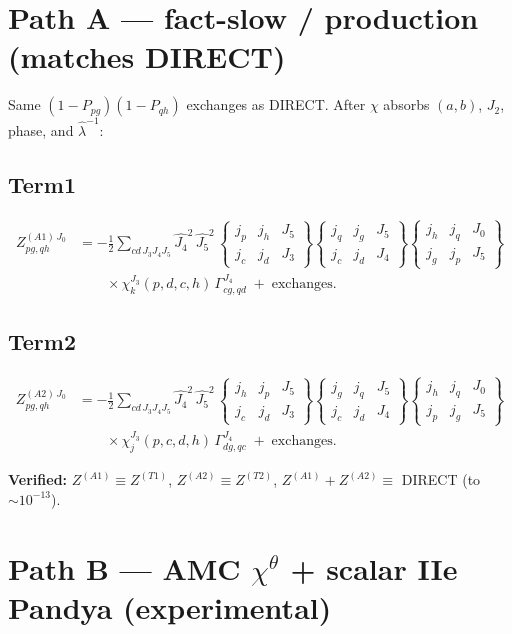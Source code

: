 \documentclass[11pt]{article}
\newcommand{\sixj}[6]{\begin{Bmatrix} #1 & #2 & #3 \\ #4 & #5 & #6 \end{Bmatrix}}
\newcommand{\Jhat}[1]{\widehat{#1}}
\begin{document}
\section{Path A --- fact-slow / production (matches DIRECT)}
\label{sec:patha}

Same $(1-P_{pg})(1-P_{qh})$ exchanges as DIRECT. After $\chi$ absorbs
$(a,b)$, $J_2$, phase, and $\hat\lambda^{-1}$:

\subsection{Term1}
\begin{equation}
\begin{aligned}
Z^{(A1)\,J_0}_{pg,qh}
&=-\frac12\sum_{cd\,J_3J_4J_5}
\Jhat{J_4}^{2}\,\Jhat{J_5}^{2}\,
\sixj{j_p}{j_h}{J_5}{j_c}{j_d}{J_3}
\sixj{j_q}{j_g}{J_5}{j_c}{j_d}{J_4}
\sixj{j_h}{j_q}{J_0}{j_g}{j_p}{J_5}\\
&\qquad\times
\chi_k^{J_3}(p,d,c,h)\,
\Gamma^{J_4}_{cg,qd}
\;+\;\text{exchanges}.
\end{aligned}
\label{eq:patha-t1}
\end{equation}

\subsection{Term2}
\begin{equation}
\begin{aligned}
Z^{(A2)\,J_0}_{pg,qh}
&=-\frac12\sum_{cd\,J_3J_4J_5}
\Jhat{J_4}^{2}\,\Jhat{J_5}^{2}\,
\sixj{j_h}{j_p}{J_5}{j_c}{j_d}{J_3}
\sixj{j_g}{j_q}{J_5}{j_c}{j_d}{J_4}
\sixj{j_h}{j_q}{J_0}{j_p}{j_g}{J_5}\\
&\qquad\times
\chi_j^{J_3}(p,c,d,h)\,
\Gamma^{J_4}_{dg,qc}
\;+\;\text{exchanges}.
\end{aligned}
\label{eq:patha-t2}
\end{equation}

\textbf{Verified:} $Z^{(A1)}\equiv Z^{(T1)}$, $Z^{(A2)}\equiv Z^{(T2)}$,
$Z^{(A1)}+Z^{(A2)}\equiv$ DIRECT (to $\sim 10^{-13}$).

\section{Path B --- AMC $\chi^\theta$ + scalar IIe Pandya (experimental)}
\label{sec:pathb}
\end{document}
